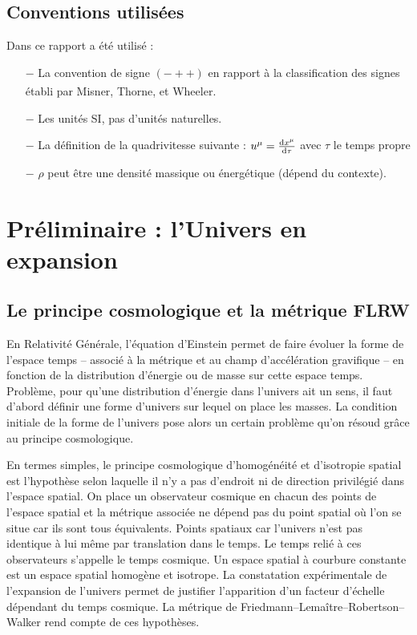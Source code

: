 \documentclass[10pt, a4paper]{report}
\numberwithin{equation}{subsection}
\begin{document}


\subsection*{Conventions utilisées}

Dans ce rapport a été utilisé :
\begin{itemize}
	\item[$-$] La convention de signe $(-++)$ en rapport à la classification des signes établi par Misner, Thorne, et Wheeler\textsuperscript{\cite{Signes}}.
	\item[$-$] Les unités SI, pas d'unités naturelles.
	\item[$-$] La définition de la quadrivitesse suivante : $u^\mu = \frac{{\rm d}x^\mu}{{\rm d}\tau}$ avec $\tau$ le temps propre
	\item[$-$] $\rho$ peut être une densité massique ou énergétique (dépend du contexte).
\end{itemize}



\section{Préliminaire : l'Univers en expansion}

\subsection{Le principe cosmologique et la métrique FLRW}
En Relativité Générale, l'équation d'Einstein permet de faire évoluer la forme de l'espace temps -- associé à la métrique et au champ d'accélération gravifique -- en fonction de la distribution d'énergie ou de masse sur cette espace temps. Problème, pour qu'une distribution d'énergie dans l'univers ait un sens, il faut d'abord définir une forme d'univers sur lequel on place les masses. La condition initiale de la forme de l'univers pose alors un certain problème qu'on résoud grâce au principe cosmologique.

En termes simples, le principe cosmologique d'homogénéité et d'isotropie spatial est l'hypothèse selon laquelle il n'y a pas d'endroit ni de direction privilégié dans l'espace spatial. On place un observateur cosmique en chacun des points de l'espace spatial et la métrique associée ne dépend pas du point spatial où l'on se situe car ils sont tous équivalents. Points spatiaux car l'univers n'est pas identique à lui même par translation dans le temps. Le temps relié à ces observateurs s'appelle le temps cosmique. Un espace spatial à courbure constante est un espace spatial homogène et isotrope.  La constatation expérimentale de l'expansion de l'univers permet de justifier l'apparition d'un facteur d'échelle dépendant du temps cosmique. La métrique de Friedmann–Lemaître–Robertson–Walker rend compte de ces hypothèses.
\end{document}

